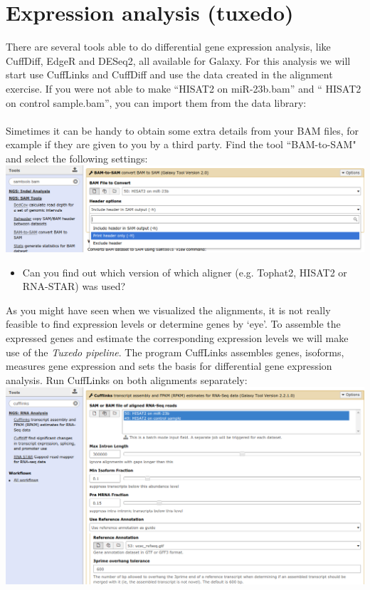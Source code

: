 \section{Expression analysis (tuxedo)}
There are several tools able to do differential gene expression analysis, like CuffDiff, EdgeR and DESeq2, all available for Galaxy. For this analysis we will start use CuffLinks and CuffDiff and use the data created in the alignment exercise. If you were not able to make ``HISAT2 on miR-23b.bam'' and `` HISAT2 on control sample.bam'', you can import them from the data library:\\
\datalibrarydirrnaseqtuxedo \\
Simetimes it can be handy to obtain some extra details from your BAM files, for example if they are given to you by a third party. Find the tool ``BAM-to-SAM" and select the following settings:\\
\includegraphics[width=\textwidth]{figures/basic_01.png}\\
\begin{itemize}
	\item Can you find out which version of which aligner (e.g. Tophat2, HISAT2 or RNA-STAR) was used?
\end{itemize}
As you might have seen when we visualized the alignments, it is not really feasible to find expression levels or determine genes by `eye'. To assemble the expressed genes and estimate the corresponding expression levels we will make use of the \textit{Tuxedo pipeline}. The program CuffLinks assembles genes, isoforms, measures gene expression and sets the basis for differential gene expression analysis. Run CuffLinks on both alignments separately:\\
\includegraphics[width=\textwidth]{figures/basic_02a.png}\\
